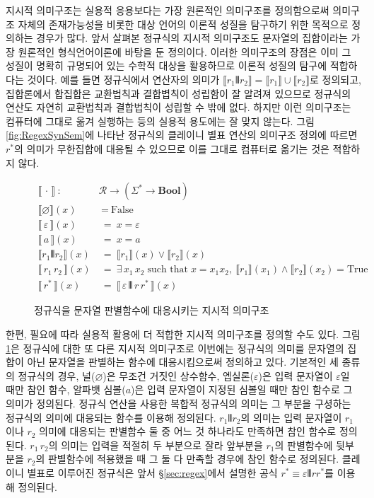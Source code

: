 지시적 의미구조는 실용적 응용보다는 가장 원론적인 의미구조를 정의함으로써
의미구조 자체의 존재가능성을 비롯한 대상 언어의 이론적 성질을 탐구하기 위한
목적으로 정의하는 경우가 많다. 앞서 살펴본 정규식의 지시적 의미구조도
문자열의 집합이라는 가장 원론적인 형식언어이론에 바탕을 둔 정의이다.
이러한 의미구조의 장점은 이미 그 성질이 명확히 규명되어 있는 수학적 대상을
활용하므로 이론적 성질의 탐구에 적합하다는 것이다. 예를 들면
정규식에서 \VERT 연산자의 의미가 $ \llbracket r_1\VERT r_2\rrbracket
= \llbracket r_1\rrbracket\cup\llbracket r_2\rrbracket$로 정의되고,
집합론에서 합집합은 교환법칙과 결합볍칙이 성립함이 잘 알려져 있으므로
정규식의 \VERT 연산도 자연히 교환법칙과 결합법칙이 성립할 수 밖에 없다.
하지만 이런 의미구조는 컴퓨터에 그대로 옮겨 실행하는 등의 실용적 용도에는
잘 맞지 않는다. 그림\;\ref{fig:RegexSynSem}에 나타난 정규식의
클레이니 별표 연산의 의미구조 정의에 따르면 $r^{*}$의 의미가 무한집합에
대응될 수 있으므로 이를 그대로 컴퓨터로 옮기는 것은 적합하지 않다.

\begin{figure}
\begin{align*}
\llbracket\,\cdot\,\rrbracket
 ~:~& \mathcal{R} \to (\Sigma^{*} \to \textbf{Bool})
\\
\llbracket \varnothing \rrbracket(x)   &~=~ \text{False} \\
\llbracket\,\varepsilon\,\rrbracket(x) &~=~ x=\varepsilon \\
\llbracket\,a\,\rrbracket(x)           &~=~ x=a \\
\llbracket r_1 \VERT r_2 \rrbracket(x) &~=~
 \llbracket r_1\rrbracket(x) \lor \llbracket r_2\rrbracket(x)\\
\llbracket\,r_1 \, r_2\,\rrbracket(x) &~=~
  \exists\,x_1\,x_2 \;\text{such that}\; x=x_1x_2,~
  \llbracket r_1\rrbracket(x_1) \land \llbracket r_2\rrbracket(x_2)
  = \text{True} \\
\llbracket\, r^{*} \,\rrbracket(x) &~=~
 \llbracket\,\varepsilon\,\VERT\,r\,r^{*}\,\rrbracket(x)
\end{align*}
\caption{정규식을 문자열 판별함수에 대응시키는
         지시적 의미구조\label{fig:RegexDenoSem}}
\end{figure}

한편, 필요에 따라 실용적 활용에 더 적합한 지시적 의미구조를
정의할 수도 있다. 그림\;\ref{fig:RegexDenoSem}은 정규식에 대한
또 다른 지시적 의미구조로 이번에는 정규식의 의미를 문자열의 집합이
아닌 문자열을 판별하는 함수에 대응시킴으로써 정의하고 있다. 기본적인
세 종류의 정규식의 경우, 널($\varnothing$)은 무조건 거짓인 상수함수,
엡실론($\varepsilon$)은 입력 문자열이 $\varepsilon$일 때만 참인 함수,
알파뱃 심볼($a$)은 입력 문자열이 지정된 심볼일 때만 참인 함수로 그
의미가 정의된다. 정규식 연산을 사용한 복합적 정규식의 의미는
그 부분을 구셩하는 정규식의 의미에 대응되는 함수를 이용해 정의된다.
$r_1\VERT r_2$의 의미는 입력 문자열이 $r_1$이나 $r_2$ 의미에 대응되는
판별함수 둘 중 어느 것 하나라도 만족하면 참인 함수로 정의된다.
$r_1\,r_2$의 의미는 입력을 적절히 두 부분으로 잘라 앞부분을 $r_1$의
판별함수에 뒷부분을 $r_2$의 판별함수에 적용했을 때 그 둘 다
만족할 경우에 참인 함수로 정의된다. 클레이니 별표로
이루어진 정규식은 앞서 \S\ref{sec:regex}에서 설명한 공식
$r^{*} \equiv \varepsilon\VERT rr^{*}$를 이용해 정의된다.

